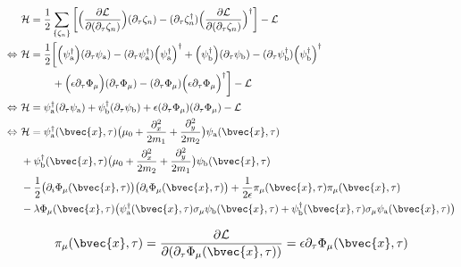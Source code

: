 %
\begin{align}
	&\mathcal{H} = 
		\frac{1}{2} \sum\limits_{\{\zeta_{n}\}} \bigg[
		\Big(\frac{\partial\mathcal{L}}{\partial(\partial_{\tau}\zeta_{n})}\Big) (\partial_{\tau}\zeta_{n}) 
		-
		(\partial_{\tau}\zeta_{n}^{\dag}) \Big(\frac{\partial\mathcal{L}}{\partial(\partial_{\tau}\zeta_{n})}\Big)^{\dag}
		\bigg]
		-
		\mathcal{L}
		\notag \\
	\Leftrightarrow\ &\mathcal{H} = 
		\frac{1}{2} \bigg[ 
		\Big(\psi_{\mathrm{a}}^{\dag}\Big) (\partial_{\tau}\psi_{\mathrm{a}}) 
		-
		(\partial_{\tau}\psi_{\mathrm{a}}^{\dag}) \Big(\psi_{\mathrm{a}}^{\dag}\Big)^{\dag}
		+
		\Big(\psi_{\mathrm{b}}^{\dag}\Big) (\partial_{\tau}\psi_{\mathrm{b}}) 
		-
		(\partial_{\tau}\psi_{\mathrm{b}}^{\dag}) \Big(\psi_{\mathrm{b}}^{\dag}\Big)^{\dag}
		\notag \\
		&\hspace{1.05cm}+
		\Big(\epsilon  \partial_{\tau}\Phi_{\mu}\Big) (\partial_{\tau}\Phi_{\mu}) 
		-
		(\partial_{\tau}\Phi_{\mu}) \Big(\epsilon \partial_{\tau} \Phi_{\mu}\Big)^{\dag}
		\bigg]
		-\mathcal{L}
		\notag \\
	\Leftrightarrow\ &\mathcal{H} = 
		\psi_{\mathrm{a}}^{\dag} (\partial_{\tau}\psi_{\mathrm{a}}) 
		+
		\psi_{\mathrm{b}}^{\dag} (\partial_{\tau}\psi_{\mathrm{b}}) 
		+
		\epsilon  (\partial_{\tau} \Phi_{\mu}) (\partial_{\tau} \Phi_{\mu}) 
		-
		\mathcal{L}
		\notag \\
	\Leftrightarrow\ &\mathcal{H} = 
		\psi_{\mathrm{a}}^{\dag}(\bvec{x},\tau) \big( \mu_{0} + \frac{\partial_{x}^{2}}{2m_{1}} + \frac{\partial_{y}^{2}}{2m_{2}} \big) \psi_{\mathrm{a}}(\bvec{x},\tau)
		\notag \\&
		+ 
		\psi_{\mathrm{b}}^{\dag}(\bvec{x},\tau) \big( \mu_{0} + \frac{\partial_{x}^{2}}{2m_{2}} + \frac{\partial_{y}^{2}}{2m_{1}} \big) \psi_{\mathrm{b}}(\bvec{x},\tau)
		\notag \\&
		- 
		\frac{1}{2} \big(\partial_{i} \Phi_{\mu}(\bvec{x},\tau)\big) \big(\partial_{i} \Phi_{\mu}(\bvec{x},\tau)\big)
		+ 
		\frac{1}{2\epsilon} \pi_{\mu}(\bvec{x},\tau) \pi_{\mu}(\bvec{x},\tau)
		\notag \\&
		-	
		\lambda \Phi_{\mu}(\bvec{x},\tau) \big(\psi_{\mathrm{a}}^{\dag}(\bvec{x},\tau) \sigma_{\mu} \psi_{\mathrm{b}}(\bvec{x},\tau) + \psi_{\mathrm{b}}^{\dag}(\bvec{x},\tau) \sigma_{\mu} \psi_{\mathrm{a}}(\bvec{x},\tau)\big)
\end{align}
%




%
\begin{align}
	\pi_{\mu}(\bvec{x},\tau) = \frac{\partial \mathcal{L}}{\partial(\partial_{\tau} \Phi_{\mu}(\bvec{x},\tau))} = \epsilon \partial_{\tau} \Phi_{\mu}(\bvec{x},\tau)
\end{align}
%






